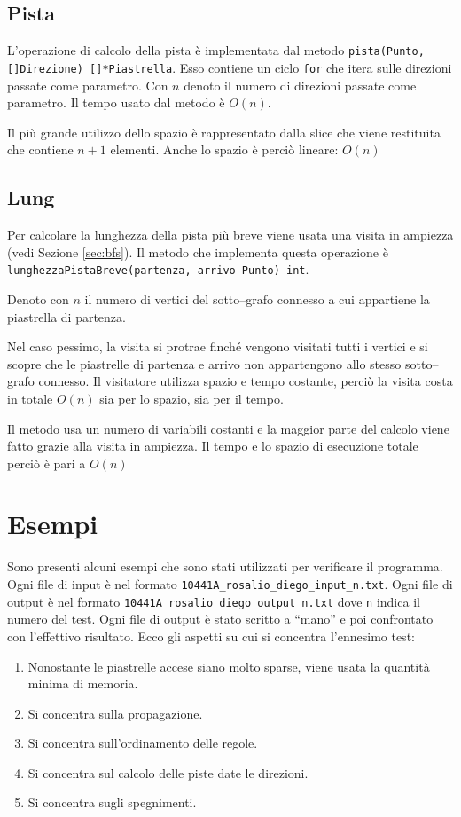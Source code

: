 \documentclass[a4paper,12pt]{article}
\begin{document}
	\subsection{Pista}
	L'operazione di calcolo della pista è implementata dal metodo \texttt{pista(Punto, []Direzione) []*Piastrella}.
	Esso contiene un ciclo \texttt{for} che itera sulle direzioni passate come parametro.
	Con \(n\) denoto il numero di direzioni passate come parametro.
	Il tempo usato dal metodo è \(O(n)\).
	
	Il più grande utilizzo dello spazio è rappresentato dalla slice che viene restituita che contiene \(n+1\) elementi.
	Anche lo spazio è perciò lineare: \(O(n)\)
	
	\subsection{Lung}
	Per calcolare la lunghezza della pista più breve viene usata una visita in ampiezza (vedi Sezione \ref{sec:bfs}).
	Il metodo che implementa questa operazione è \texttt{lunghezzaPistaBreve(partenza, arrivo Punto) int}.
	
	Denoto con \(n\) il numero di vertici del sotto--grafo connesso a cui appartiene la piastrella di partenza.
	
	Nel caso pessimo, la visita si protrae finché vengono visitati tutti i vertici e si scopre che le piastrelle di partenza e arrivo non appartengono allo stesso sotto--grafo connesso.
	Il visitatore utilizza spazio e tempo costante, perciò la visita costa in totale \(O(n)\) sia per lo spazio, sia per il tempo.
	
	Il metodo usa un numero di variabili costanti e la maggior parte del calcolo viene fatto grazie alla visita in ampiezza.
	Il tempo e lo spazio di esecuzione totale perciò è pari a \(O(n)\)
	
	\section{Esempi}
	Sono presenti alcuni esempi che sono stati utilizzati per verificare il programma.
	Ogni file di input è nel formato \texttt{10441A\_rosalio\_diego\_input\_n.txt}.
	Ogni file di output è nel formato \texttt{10441A\_rosalio\_diego\_output\_n.txt} dove \texttt{n} indica il numero del test.
	Ogni file di output è stato scritto a ``mano'' e poi confrontato con l'effettivo risultato.
	Ecco gli aspetti su cui si concentra l'ennesimo test: 
	\begin{enumerate}
		\item Nonostante le piastrelle accese siano molto sparse, viene usata la quantità minima di memoria.
		\item Si concentra sulla propagazione.
		\item Si concentra sull'ordinamento delle regole.
		\item Si concentra sul calcolo delle piste date le direzioni.
		\item Si concentra sugli spegnimenti.
	\end{enumerate}
	
\end{document}

